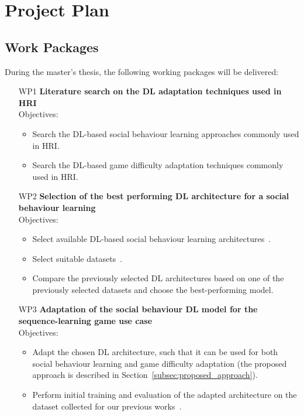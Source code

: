 \documentclass[thesis]{mas_proposal}
\begin{document}
\section{Project Plan}

\subsection{Work Packages}
During the master's thesis, the following working packages will be delivered:

\begin{enumerate}
	\item[WP1] \textbf{Literature search on the DL adaptation techniques used in HRI} \\ Objectives:
	\begin{itemize}
		\item Search the DL-based social behaviour learning approaches commonly used in HRI.
		\item Search the DL-based game difficulty adaptation techniques commonly used in HRI. 
	\end{itemize}
	\item [WP2] \textbf{Selection of the best performing DL architecture for a social behaviour learning} \\
	Objectives:
	\begin{itemize}
		\item Select available DL-based social behaviour learning architectures~\cite{Romeo2018,Romeo2019,Qureshi2016,Qureshi2017,Belo2022}.
		\item Select suitable datasets~\cite{Ko2021,Shahroudy_2016_CVPR,Liu2020,patrona2021overview}.
		\item Compare the previously selected DL architectures based on one of the previously selected datasets and choose the best-performing model.
	\end{itemize}
	\item [WP3] \textbf{Adaptation of the social behaviour DL model for the sequence-learning game use case} \\
	Objectives:
	\begin{itemize}
		\item Adapt the chosen DL architecture, such that it can be used for both social behaviour learning and game difficulty adaptation (the proposed approach is described in Section~\ref{subsec:proposed_approach}).
		\item Perform initial training and evaluation of the adapted architecture on the dataset collected for our previous works~\cite{stolarz2022personalisedrobot,stolarz2022learningbased}.

\end{itemize}
\end{enumerate}
\end{document}

